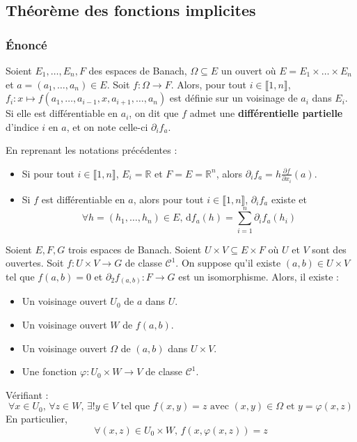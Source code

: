   \subsection{Théorème des fonctions implicites}

  \subsubsection{Énoncé}


  \begin{definition}
    Soient $E_1, \dots, E_n, F$ des espaces de Banach, $\Omega \subseteq E$ un ouvert où $E = E_1 \times \dots \times E_n$ et $a = (a_1, \dots, a_n) \in E$. Soit $f : \Omega \rightarrow F$. Alors, pour tout $i \in \llbracket 1, n \rrbracket$, $f_i : x \mapsto f(a_1, \dots, a_{i-1}, x, a_{i+1}, \dots, a_n)$ est définie sur un voisinage de $a_i$ dans $E_i$. Si elle est différentiable en $a_i$, on dit que $f$ admet une \textbf{différentielle partielle} d'indice $i$ en $a$, et on note celle-ci $\partial_i f_a$.
  \end{definition}

  \begin{remark}
    En reprenant les notations précédentes :
    \begin{itemize}
      \item Si pour tout $i \in \llbracket 1, n \rrbracket$, $E_i = \mathbb{R}$ et $F = E = \mathbb{R}^n$, alors $\partial_i f_a = h \frac{\partial f}{\partial x_i} (a)$.
      \item Si $f$ est différentiable en $a$, alors pour tout $i \in \llbracket 1, n \rrbracket$, $\partial_i f_a$ existe et
      \[ \forall h = (h_1, \dots, h_n) \in E, \, \mathrm{d}f_a(h) = \sum_{i=1}^{n} \partial_i f_a(h_i) \]
    \end{itemize}
  \end{remark}

  \begin{theorem}
    Soient $E, F, G$ trois espaces de Banach. Soient $U \times V \subseteq E \times F$ où $U$ et $V$ sont des ouvertes. Soit $f : U \times V \rightarrow G$ de classe $\mathcal{C}^1$. On suppose qu'il existe $(a,b) \in U \times V$ tel que $f(a,b)=0$ et $\partial_2 f_{(a,b)} : F \rightarrow G$ est un isomorphisme. Alors, il existe :
    \begin{itemize}
      \item Un voisinage ouvert $U_0$ de $a$ dans $U$.
      \item Un voisinage ouvert $W$ de $f(a,b)$.
      \item Un voisinage ouvert $\Omega$ de $(a,b)$ dans $U \times V$.
      \item Une fonction $\varphi : U_0 \times W \rightarrow V$ de classe $\mathcal{C}^1$.
    \end{itemize}
    Vérifiant :
    \[ \forall x \in U_0, \, \forall z \in W, \, \exists! y \in V \text{ tel que } f(x,y)=z \text{ avec } (x, y) \in \Omega \text{ et } y=\varphi(x,z) \]
    En particulier,
    \[ \forall (x,z) \in U_0 \times W, \, f(x, \varphi(x,z)) = z \]
  \end{theorem}

